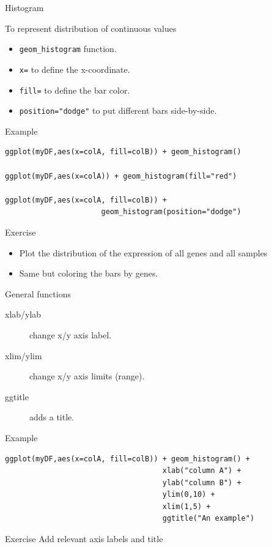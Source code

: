 \documentclass[10pt]{beamer}
\begin{document}
\begin{frame}[fragile, shrink=5]{Histogram}
  \begin{block}{To represent distribution of continuous values}
    \begin{itemize}
    \item \verb!geom_histogram! function.
    \item \verb!x=! to define the x-coordinate.
      \bigskip
    \item \verb!fill=! to define the bar color.
    \item \verb!position="dodge"! to put different bars side-by-side.
    \end{itemize}
  \end{block}
  \begin{exampleblock}{Example}
\begin{verbatim}
ggplot(myDF,aes(x=colA, fill=colB)) + geom_histogram()

ggplot(myDF,aes(x=colA)) + geom_histogram(fill="red")

ggplot(myDF,aes(x=colA, fill=colB)) + 
                      geom_histogram(position="dodge")
\end{verbatim}
  \end{exampleblock}
  \begin{alertblock}{Exercise}
    \begin{itemize}
    \item Plot the distribution of the expression of all genes and all samples
    \item Same but coloring the bars by genes.
    \end{itemize}
  \end{alertblock}
\end{frame}

\begin{frame}[fragile]{General functions}
  \begin{block}{}
    \begin{description}
    \item[xlab/ylab] change x/y axis label.
    \item[xlim/ylim] change x/y axis limits (range).
    \item[ggtitle] adds a title.
    \end{description}
  \end{block}
  \begin{exampleblock}{Example}
\begin{verbatim}
ggplot(myDF,aes(x=colA, fill=colB)) + geom_histogram() +
                                    xlab("column A") + 
                                    ylab("column B") +   
                                    ylim(0,10) +   
                                    xlim(1,5) +   
                                    ggtitle("An example")
\end{verbatim}
  \end{exampleblock}
  \begin{alertblock}{Exercise}
    Add relevant axis labels and title
  \end{alertblock}
\end{frame}
\end{document}

